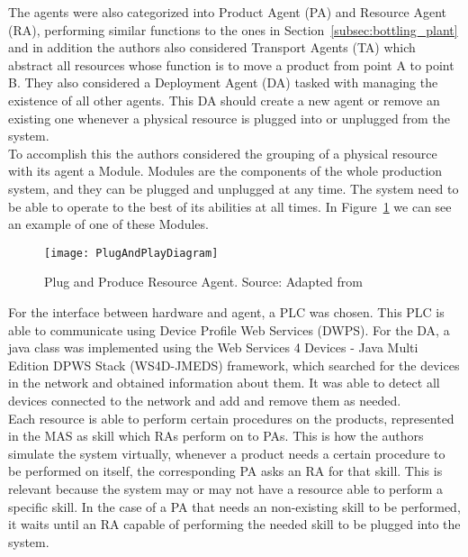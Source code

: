 The agents were also categorized into Product Agent (PA) and Resource Agent (RA), performing similar functions to the ones in Section~\ref{subsec:bottling_plant} and in addition the authors also considered Transport Agents (TA) which abstract all resources whose function is to move a product from point A to point B. They also considered a Deployment Agent (DA) tasked with managing the existence of all other agents. This DA should create a new agent or remove an existing one whenever a physical resource is plugged into or unplugged from the system.\\

To accomplish this the authors considered the grouping of a physical resource with its agent a Module. Modules are the components of the whole production system, and they can be plugged and unplugged at any time. The system need to be able to operate to the best of its abilities at all times. In Figure~\ref{fig:plug_and_play_device_architecture} we can see an example of one of these Modules.\\

\begin{figure}[hbt!]
	\centering
	\texttt{[image: PlugAndPlayDiagram]}
	\caption{Plug and Produce Resource Agent. Source: Adapted from \cite{8972169}}
	\label{fig:plug_and_play_device_architecture}
\end{figure}

For the interface between hardware and agent, a PLC was chosen. This PLC is able to communicate using Device Profile Web Services (DWPS). For the DA, a java class was implemented using the Web Services 4 Devices - Java Multi Edition DPWS Stack (WS4D-JMEDS) framework, which searched for the devices in the network and obtained information about them. It was able to detect all devices connected to the network and add and remove them as needed.\\

Each resource is able to perform certain procedures on the products, represented in the MAS as skill which RAs perform on to PAs. This is how the authors simulate the system virtually, whenever a product needs a certain procedure to be performed on itself, the corresponding PA asks an RA for that skill. This is relevant because the system may or may not have a resource able to perform a specific skill. In the case of a PA that needs an non-existing skill to be performed, it waits until an RA capable of performing the needed skill to be plugged into the system.\\

